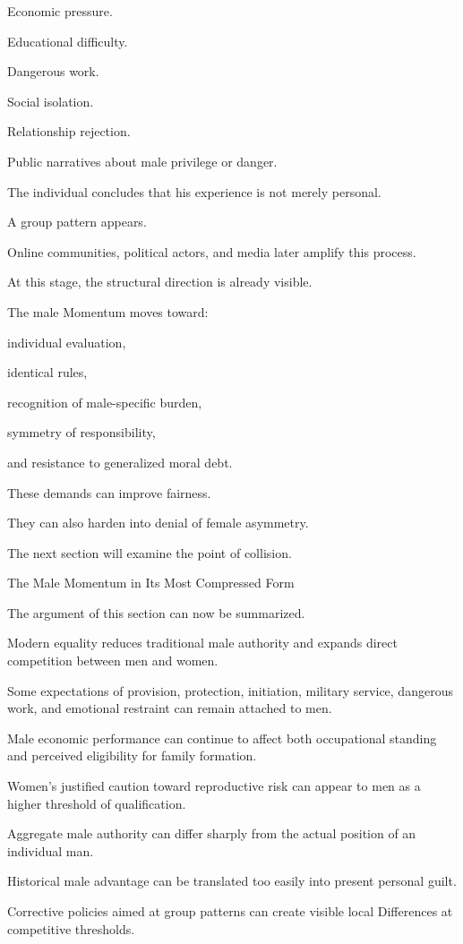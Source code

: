 Economic pressure.

Educational difficulty.

Dangerous work.

Social isolation.

Relationship rejection.

Public narratives about male privilege or danger.

The individual concludes that his experience is not merely personal.

A group pattern appears.

Online communities, political actors, and media later amplify this process.

At this stage, the structural direction is already visible.

The male Momentum moves toward:

individual evaluation,

identical rules,

recognition of male-specific burden,

symmetry of responsibility,

and resistance to generalized moral debt.

These demands can improve fairness.

They can also harden into denial of female asymmetry.

The next section will examine the point of collision.

The Male Momentum in Its Most Compressed Form

The argument of this section can now be summarized.

Modern equality reduces traditional male authority and expands direct competition between men and women.

Some expectations of provision, protection, initiation, military service, dangerous work, and emotional restraint can remain attached to men.

Male economic performance can continue to affect both occupational standing and perceived eligibility for family formation.

Women’s justified caution toward reproductive risk can appear to men as a higher threshold of qualification.

Aggregate male authority can differ sharply from the actual position of an individual man.

Historical male advantage can be translated too easily into present personal guilt.

Corrective policies aimed at group patterns can create visible local Differences at competitive thresholds.

